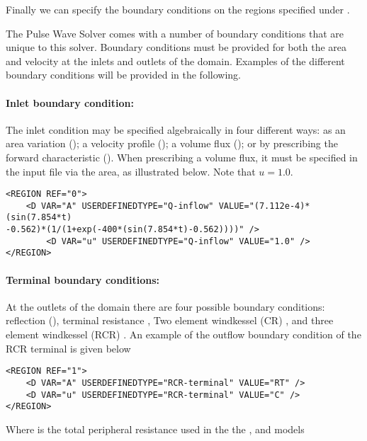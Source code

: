 Finally we can specify the boundary conditions on the regions specified under .

The Pulse Wave Solver comes with a number of boundary conditions that are unique to this solver. Boundary conditions must be provided for both the area and velocity at the inlets and outlets of the domain. Examples of the different boundary conditions will be provided in the following.

\paragraph{Inlet boundary condition:~} The inlet condition may be specified algebraically in four different ways: as an area variation (); a velocity profile (); a volume flux (); or by prescribing the forward characteristic (). When prescribing a volume flux, it must be specified in the input file via the area, as illustrated below. Note that $u = 1.0$.

\begin{lstlisting}[style=XmlStyle]
<REGION REF="0">
	<D VAR="A" USERDEFINEDTYPE="Q-inflow" VALUE="(7.112e-4)*(sin(7.854*t) 
-0.562)*(1/(1+exp(-400*(sin(7.854*t)-0.562))))" />
        <D VAR="u" USERDEFINEDTYPE="Q-inflow" VALUE="1.0" />
</REGION>
\end{lstlisting}

\paragraph{Terminal boundary conditions:~} At the outlets of the domain there are four possible boundary conditions: reflection (), terminal resistance , 
Two element windkessel (CR)  , and three element windkessel (RCR) .  An example of the outflow boundary condition of the RCR terminal is given below
\begin{lstlisting}[style=XmlStyle]
<REGION REF="1">
	<D VAR="A" USERDEFINEDTYPE="RCR-terminal" VALUE="RT" />
	<D VAR="u" USERDEFINEDTYPE="RCR-terminal" VALUE="C" />
</REGION>
\end{lstlisting}
Where  is the total peripheral resistance  used in the the  ,  and   models

